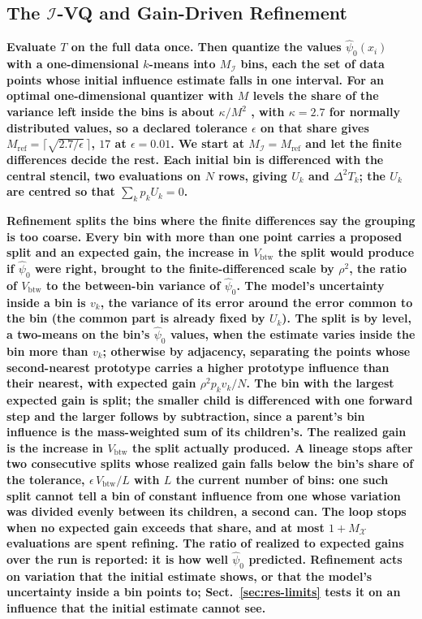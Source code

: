 \documentclass[runningheads]{llncs}
\newif\ifrev \revtrue
\newcommand{\rev}[1]{\ifrev{\color{blue}\bfseries #1}\else#1\fi}
\newcommand{\Vcell}{V_{\mathrm{btw}}}
\newcommand{\MX}{M_{\mathcal{X}}}
\newcommand{\MI}{M_{\mathcal{I}}}
\newcommand{\psinull}{\hat{\psi}_0}
\begin{document}
\subsection{The $\mathcal{I}$-VQ and Gain-Driven Refinement}\label{sec:ivq}

\rev{Evaluate $T$ on the full data once. Then quantize the values $\psinull(x_i)$ with a one-dimensional $k$-means into $\MI$ bins, each the set of data points whose initial influence estimate falls in one interval. For an optimal one-dimensional quantizer with $M$ levels the share of the variance left inside the bins is about $\kappa/M^2$ \cite{panter1951,graf2000}, with $\kappa = 2.7$ for normally distributed values, so a declared tolerance $\epsilon$ on that share gives $M_{\mathrm{ref}} = \lceil\sqrt{2.7/\epsilon}\,\rceil$, $17$ at $\epsilon = 0.01$. We start at $\MI = M_{\mathrm{ref}}$ and let the finite differences decide the rest. Each initial bin is differenced with the central stencil, two evaluations on $N$ rows, giving $U_k$ and $\Delta^2 T_k$; the $U_k$ are centred so that $\sum_k p_k U_k = 0$.}

\rev{Refinement splits the bins where the finite differences say the grouping is too coarse. Every bin with more than one point carries a proposed split and an expected gain, the increase in $\Vcell$ the split would produce if $\psinull$ were right, brought to the finite-differenced scale by $\rho^2$, the ratio of $\Vcell$ to the between-bin variance of $\psinull$. The model's uncertainty inside a bin is $v_k$, the variance of its error around the error common to the bin (the common part is already fixed by $U_k$). The split is by level, a two-means on the bin's $\psinull$ values, when the estimate varies inside the bin more than $v_k$; otherwise by adjacency, separating the points whose second-nearest prototype carries a higher prototype influence than their nearest, with expected gain $\rho^2 p_k v_k/N$. The bin with the largest expected gain is split; the smaller child is differenced with one forward step and the larger follows by subtraction, since a parent's bin influence is the mass-weighted sum of its children's. The realized gain is the increase in $\Vcell$ the split actually produced. A lineage stops after two consecutive splits whose realized gain falls below the bin's share of the tolerance, $\epsilon\,\Vcell/L$ with $L$ the current number of bins: one such split cannot tell a bin of constant influence from one whose variation was divided evenly between its children, a second can. The loop stops when no expected gain exceeds that share, and at most $1 + \MX$ evaluations are spent refining. The ratio of realized to expected gains over the run is reported: it is how well $\psinull$ predicted. Refinement acts on variation that the initial estimate shows, or that the model's uncertainty inside a bin points to; Sect.~\ref{sec:res-limits} tests it on an influence that the initial estimate cannot see.}
\end{document}
